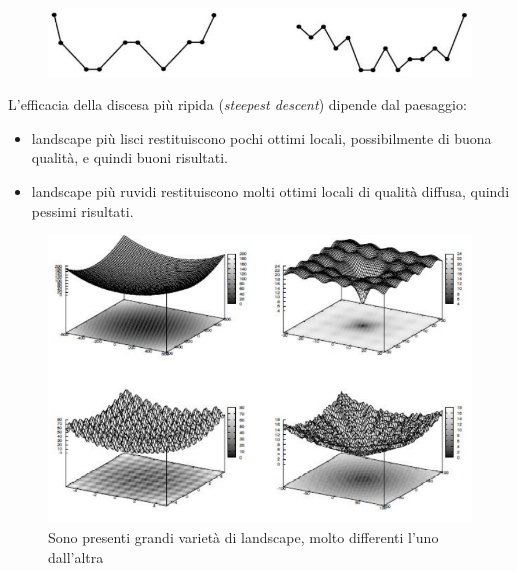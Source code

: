 \documentclass{article}
\begin{document}
\begin{figure}[H]
    \centering
    \includegraphics[scale=0.5]{images/landscape.png}
\end{figure}

L'efficacia della discesa più ripida (\textit{steepest descent}) dipende dal paesaggio:
\begin{itemize}
    \item landscape più lisci restituiscono pochi ottimi locali, possibilmente di buona qualità, e quindi buoni risultati.
    \item landscape più ruvidi restituiscono molti ottimi locali di qualità diffusa, quindi pessimi risultati.
\end{itemize}

\begin{figure}[H]
    \centering
    \includegraphics[scale=0.5]{images/landscape_1.png}
    \caption{Sono presenti grandi varietà di landscape, molto differenti l'uno dall'altra}
\end{figure}
\end{document}
